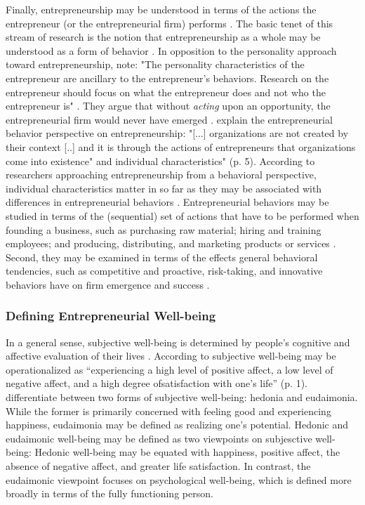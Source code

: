 \documentclass[a4paper,man,noextraspace,natbib]{apa6}
\begin{document}
Finally, entrepreneurship may be understood in terms of the actions the entrepreneur (or the entrepreneurial firm) performs \cite[e.g.][]{Gartner1988, Lumpkin1996, Covin1991}. 
The basic tenet of this stream of research is the notion that entrepreneurship as a whole may be understood as a form of behavior \citep{Gartner1988}. 
In opposition to the personality approach toward entrepreneurship, \cite{Gartner1988} note: 
"The personality characteristics of the entrepreneur are ancillary to the entrepreneur's behaviors. Research on the entrepreneur should focus on what the entrepreneur does and not who the entrepreneur is" \cite[p.~57]{Gartner1988}. 
They argue that without \textit{acting} upon an opportunity, the entrepreneurial firm would never have emerged \citep{Gartner1988}.
\cite{Gartner2005} explain the entrepreneurial behavior perspective on entrepreneurship: 
"[...] organizations are not created by their context [..] and it is through the actions of entrepreneurs that organizations come into existence" and individual characteristics" (p. 5). 
According to researchers approaching entrepreneurship from a behavioral perspective, individual characteristics matter in so far as they may be associated with differences in entrepreneurial behaviors \citep{Gartner2005}. 
Entrepreneurial behaviors may be studied in terms of the (sequential) set of actions that have to be performed when founding a business, such as purchasing raw material; hiring and training employees; and producing, distributing, and marketing products or services \citep{Gatewood1995}. 
Second, they may be examined in terms of the effects general behavioral tendencies, such as competitive and proactive, risk-taking, and innovative behaviors have on firm emergence and success \citep{Covin1991a}. 

\subsubsection{Defining Entrepreneurial Well-being}
In a general sense, subjective well-being is determined by people's cognitive and affective evaluation of their lives \citep{Diener2000}. 
According to \cite{Deci2008} subjective well-being may be operationalized as ``experiencing a high level of positive affect, a low level of negative affect, and a high degree ofsatisfaction with one's life'' (p. 1). 
\cite{Deci2008, Ryan2001} differentiate between two forms of subjective well-being: hedonia and eudaimonia. 
While the former is primarily concerned with feeling good and experiencing happiness, eudaimonia may be defined as realizing one's potential. 
Hedonic and eudaimonic well-being may be defined as two viewpoints on subjesctive well-being: 
Hedonic well-being may be equated with happiness, positive affect, the absence of negative affect, and greater life satisfaction. In contrast, the eudaimonic viewpoint focuses on psychological well-being, which is defined more broadly in terms of the fully functioning person. \par
\end{document}
